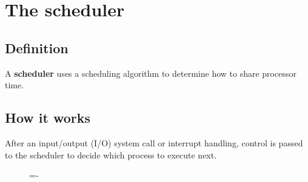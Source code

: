\documentclass[a4paper]{systems-software}
\begin{document}
\section*{The scheduler}

\subsection*{Definition}

A \textbf{scheduler} uses a scheduling algorithm to determine how to share processor time.


\subsection*{How it works}

After an input/output (I/O) system call or interrupt handling, control is passed to the scheduler to decide which process to execute next.

\begin{figure}[H]
  \lineskip=-\fboxrule
\end{figure}
\end{document}
